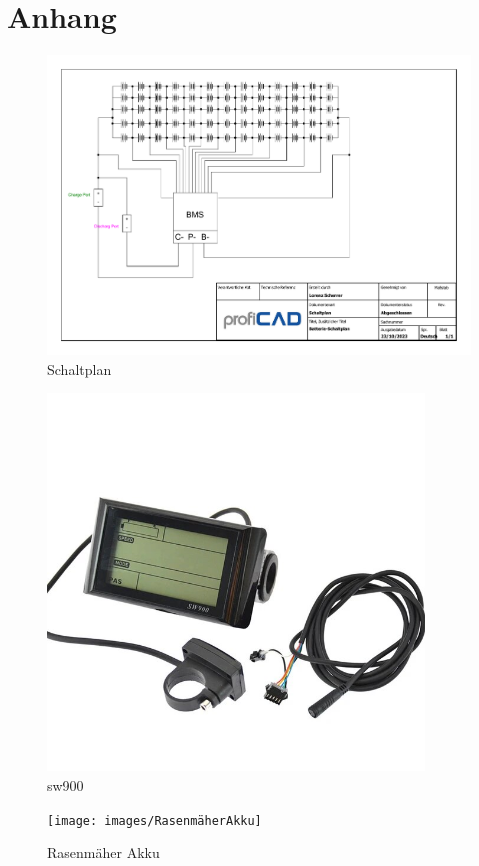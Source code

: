 

\chapter*{Anhang}
\begin{landscape}


\begin{figure}[h]
    \centering
    \includegraphics[width=22cm]{images/Schaltplan.pdf}
    \caption{Schaltplan\cite{lorenz_scherrer_selbst_2023}}%
    \label{fig:5_1}
\end{figure}
\end{landscape}

\begin{figure}[h]
    \centering
    \includegraphics[width=10cm]{images/sw900.jpeg}
    \caption{sw900\cite{lorenz_scherrer_selbst_2023}}%
    \label{fig:15}
\end{figure}


\begin{figure}[h]
    \centering
    \texttt{[image: images/RasenmäherAkku]}
    \caption{Rasenmäher Akku\cite{lorenz_scherrer_selbst_2023}}%
    \label{fig:20}
\end{figure}